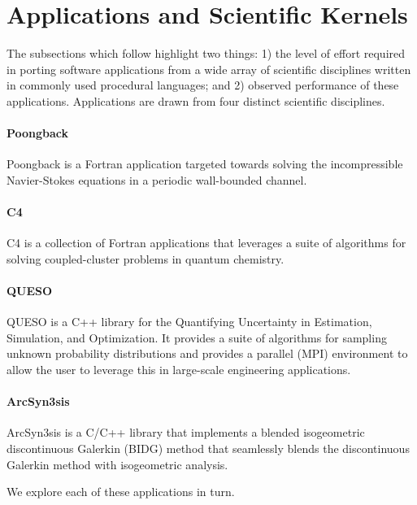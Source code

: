 \section{Applications and Scientific Kernels}
\label{sec:apps}

The subsections which follow highlight two things: 1) the level of effort
required in porting software applications from a wide array of scientific
disciplines written in commonly used procedural languages; and 2) observed
performance of these applications.  Applications are drawn from four distinct
scientific disciplines.

\paragraph{Poongback}  Poongback is a Fortran application targeted towards
solving the incompressible Navier-Stokes equations in a periodic wall-bounded
channel.

\paragraph{C4}  C4 is a collection of Fortran applications that leverages a
suite of algorithms for solving coupled-cluster problems in quantum chemistry.

\paragraph{QUESO}  QUESO is a C++ library for the Quantifying Uncertainty in
Estimation, Simulation, and Optimization.  It provides a suite of algorithms
for sampling unknown probability distributions and provides a parallel (MPI)
environment to allow the user to leverage this in large-scale engineering
applications.

\paragraph{ArcSyn3sis}  ArcSyn3sis is a C/C++ library that implements a
blended isogeometric discontinuous Galerkin (BIDG) method that seamlessly blends the discontinuous Galerkin method with isogeometric analysis.

We explore each of these applications in turn.
